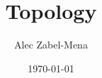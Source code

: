 \documentclass[12pt, twoside]{book}
\title{Topology}
\author{Alec Zabel-Mena}
\date{\today}
\begin{document}
\maketitle
\tableofcontents





\nocite{*}



\end{document}
